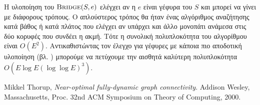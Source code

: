 \documentclass[11pt,a4paper,oneside]{report}
\begin{document}
Η υλοποίηση του $\Call{Bridge}{S, e}$ ελέγχει αν η $e$ είναι γέφυρα του $S$ και μπορεί να γίνει με διάφορους τρόπους. Ο απλούστερος τρόπος θα ήταν ένας αλγόριθμος αναζήτησης κατά βάθος ή κατά πλάτος που ελέγχει αν υπάρχει και άλλο μονοπάτι ανάμεσα στις δύο κορυφές που συνδέει η ακμή. Τότε η συνολική πολυπλοκότητα του αλγορίθμου είναι $O( E^2 )$. Αντικαθιστώντας τον έλεγχο για γέφυρες με κάποια πιο αποδοτική υλοποίηση (βλ. \cite{thorup00}) μπορούμε να πετύχουμε την αισθητά καλύτερη πολυπλοκότητα $ O(E \log E (\log \log E)^3) $.

\begin{thebibliography}{9}


  Mikkel Thorup,
  \emph{Near-optimal fully-dynamic graph connectivity}.
  Addison Wesley, Massachusetts,
  Proc. 32nd ACM Symposium on Theory of Computing,
  2000.
  
\end{thebibliography}
\end{document}
